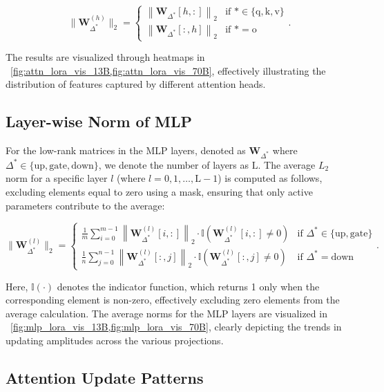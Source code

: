 \begin{equation}
\| \mathbf{W}_{\Delta^{*}}^{(h)} \|_2 = 
\begin{cases}
\left\| \mathbf{W}_{\Delta^{*}}[h, :] \right\|_2 & \text{if } {*} \in \{\text{q}, \text{k}, \text{v}\} \\
\left\| \mathbf{W}_{\Delta^{*}}[:, h] \right\|_2 & \text{if } {*} = \text{o}
\end{cases}.
\end{equation}

The results are visualized through heatmaps in ~\cref{fig:attn_lora_vis_13B,fig:attn_lora_vis_70B}, effectively illustrating the distribution of features captured by different attention heads.

\subsection{Layer-wise Norm of MLP}
For the low-rank matrices in the MLP layers, denoted as \(\mathbf{W}_{\Delta^{*}}\) where \(\Delta^{*} \in \{\text{up}, \text{gate}, \text{down}\}\), we denote the number of layers as \(\text{L}\). The average \(L_{2}\) norm for a specific layer \(l\) (where \(l = 0, 1, \ldots, \text{L} - 1\)) is computed as follows, excluding elements equal to zero using a mask, ensuring that only active parameters contribute to the average:

\begin{equation}
\| \mathbf{W}_{\Delta^{*}}^{(l)} \|_2 = 
\begin{cases}
\frac{1}{m} \sum_{i=0}^{m-1} \left\| \mathbf{W}_{\Delta^{*}}^{(l)}[i, :] \right\|_2 \cdot \mathbb{I}(\mathbf{W}_{\Delta^{*}}^{(l)}[i, :] \neq 0) & \text{if } \Delta^{*} \in \{\text{up}, \text{gate}\} \\
\frac{1}{n} \sum_{j=0}^{n-1} \left\| \mathbf{W}_{\Delta^{*}}^{(l)}[:, j] \right\|_2 \cdot \mathbb{I}(\mathbf{W}_{\Delta^{*}}^{(l)}[:, j] \neq 0) & \text{if } \Delta^{*} = \text{down}
\end{cases}.
\end{equation}

Here, \(\mathbb{I}(\cdot)\) denotes the indicator function, which returns 1 only when the corresponding element is non-zero, effectively excluding zero elements from the average calculation. The average norms for the MLP layers are visualized in ~\cref{fig:mlp_lora_vis_13B,fig:mlp_lora_vis_70B}, clearly depicting the trends in updating amplitudes across the various projections.

\subsection{Attention Update Patterns}

